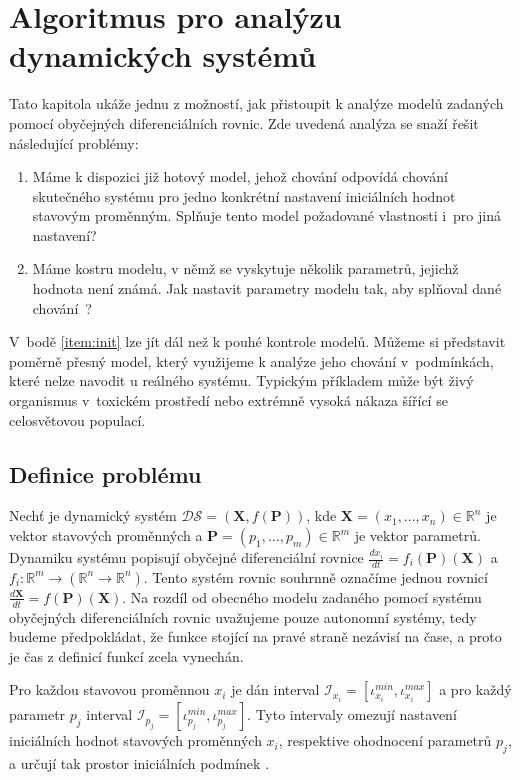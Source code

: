\chapter{Algoritmus pro analýzu dynamických systémů}\label{chapter:algorithm}

Tato kapitola ukáže jednu z možností, jak přistoupit k analýze modelů zadaných
pomocí obyčejných diferenciálních rovnic. Zde uvedená analýza se snaží řešit následující
problémy:
\begin{enumerate}
	\item\label{item:init}	Máme k dispozici již hotový model, jehož chování odpovídá chování skutečného
			systému pro jedno konkrétní nastavení iniciálních hodnot stavovým
			proměnným. Splňuje tento model požadované vlastnosti i~pro jiná nastavení?
	\item	Máme kostru modelu, v němž se vyskytuje několik parametrů, jejichž hodnota
			není známá. Jak nastavit parametry modelu tak, aby splňoval dané chování~\cite{aster2012}?
\end{enumerate}

V~bodě \ref{item:init} lze jít dál než k pouhé kontrole modelů. Můžeme si představit
poměrně přesný model, který využijeme k analýze jeho chování v~pod\-mín\-kách, které nelze
navodit u reálného systému. Typickým příkladem může být živý organismus v~toxickém
prostředí nebo extrémně vysoká nákaza šířící se ce\-lo\-svě\-to\-vou populací.

\section{Definice problému}\label{section:initial:condtion:problem:definition}

Nechť je dynamický systém $\mathcal{DS} = (\mathbf{X}, f(\mathbf{P}))$, kde $\mathbf{X} = (x_1, \ldots, x_n) \in \mathbb{R}^n$
je vektor stavových proměnných a $\mathbf{P}  = (p_1, \ldots, p_m) \in \mathbb{R}^m$ je vektor parametrů. Dynamiku systému popisují obyčejné diferenciální
rovnice $\frac{dx_i}{dt} = f_i(\mathbf{P})(\mathbf{X})$ a $f_i: \mathbb{R}^m \rightarrow (\mathbb{R}^n \rightarrow \mathbb{R}^n)$.
Tento systém rovnic souhrnně označíme jednou rovnicí $\frac{d\mathbf{X}}{dt} = f(\mathbf{P})(\mathbf{X})$. Na rozdíl
od obecného modelu zadaného pomocí systému obyčejných diferenciálních rovnic uvažujeme pouze autonomní systémy,
tedy budeme předpokládat, že funkce stojící na pravé straně ne\-zá\-vi\-sí na čase, a proto je čas z definicí funkcí zcela vynechán.

Pro každou stavovou proměnnou $x_i$ je dán interval $\mathcal{I}_{x_i} = [\iota_{x_i}^{min}, \iota_{x_i}^{max}]$
a pro každý parametr $p_j$ interval $\mathcal{I}_{p_j} = [\iota_{p_j}^{min}, \iota_{p_j}^{max}]$.
Tyto intervaly omezují nastavení iniciálních hodnot stavových proměnných $x_i$, respektive o\-hod\-no\-ce\-ní
parametrů $p_j$, a určují tak prostor iniciálních podmínek \cite[str. 23]{drazan2011}.

